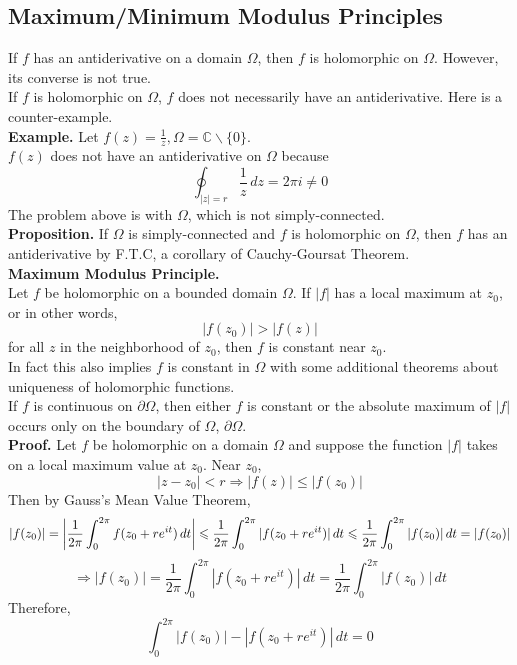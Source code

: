 \documentclass[11pt]{article}
\DeclarePairedDelimiter\abs{\lvert}{\rvert}
\begin{document}
\subsection{Maximum/Minimum Modulus Principles}
If $f$ has an antiderivative on a domain $\Omega$, then $f$ is holomorphic on $\Omega$. However, its converse is not true. \\
If $f$ is holomorphic on $\Omega$, $f$ does not necessarily have an antiderivative. Here is a counter-example.\\
\newline
\textbf{Example.} Let $f(z) = \frac{1}{z}, \Omega = \mathbb{C} \backslash \{0\}$. \\
$f(z)$ does not have an antiderivative on $\Omega$ because 
$$\oint_{|z| = r}\frac{1}{z} \,dz = 2\pi i \neq 0$$
\newline
The problem above is with $\Omega$, which is not simply-connected. \\
\newline
\textbf{Proposition.} If $\Omega$ is simply-connected and $f$ is holomorphic on $\Omega$, then $f$ has an antiderivative by F.T.C, a corollary of Cauchy-Goursat Theorem. \\
\newline
\textbf{Maximum Modulus Principle.} \\
Let $f$ be holomorphic on a bounded domain $\Omega$. If $|f|$ has a local maximum at $z_0$, or in other words, 
$$|f(z_0)| > |f(z)|$$
for all $z$ in the neighborhood of $z_0$, 
then $f$ is constant near $z_0$. \\
In fact this also implies $f$ is constant in $\Omega$ with some additional theorems about uniqueness of holomorphic functions. \\
If $f$ is continuous on $\partial \Omega$, then either $f$ is constant or the absolute maximum of $|f|$ occurs only on the boundary of $\Omega$, $\partial \Omega$. \\
\textbf{Proof.} Let $f$ be holomorphic on a domain $\Omega$ and suppose the function $|f|$ takes on a local maximum value at $z_0$. Near $z_0$, 
$$|z -z_0| < r \Rightarrow |f(z)| \leqslant |f(z_0)|$$
Then by Gauss's Mean Value Theorem, 
$$|f(z_0)| = \abs*{\frac{1}{2\pi} \int_0^{2\pi}f(z_0 + re^{it}) \,dt} \leqslant \frac{1}{2\pi}\int_0^{2\pi} |f(z_0 + re^{it})| \,dt \leqslant \frac{1}{2\pi}\int_0^{2\pi}|f(z_0)| \,dt = |f(z_0)|$$
$$\Rightarrow |f(z_0)| =  \frac{1}{2\pi}\int_0^{2\pi} |f(z_0 + re^{it})| \,dt = \frac{1}{2\pi}\int_0^{2\pi}|f(z_0)| \,dt$$
Therefore, 
$$\int_0^{2\pi}|f(z_0)| - |f(z_0 + re^{it})| \,dt = 0$$
\end{document}
